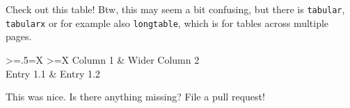 \noindent Check out this table! Btw, this may seem a bit confusing, but there is \texttt{tabular}, \texttt{tabularx} or for example also \texttt{longtable}, which is for tables across multiple pages.

\begin{table}[H]
\caption{The caption of your table.}\label{tab:example}
\begin{tabularx}{\textwidth}{{
  >{\hsize=.5\hsize\linewidth=\hsize}X
  >{\hsize\linewidth=\hsize}X
}}
\hline
Column 1 & Wider Column 2 \\ \hline \hline
Entry 1.1 & Entry 1.2 \\ \hline
\end{tabularx}
\end{table}

\noindent This was nice. Is there anything missing? File a pull request!
